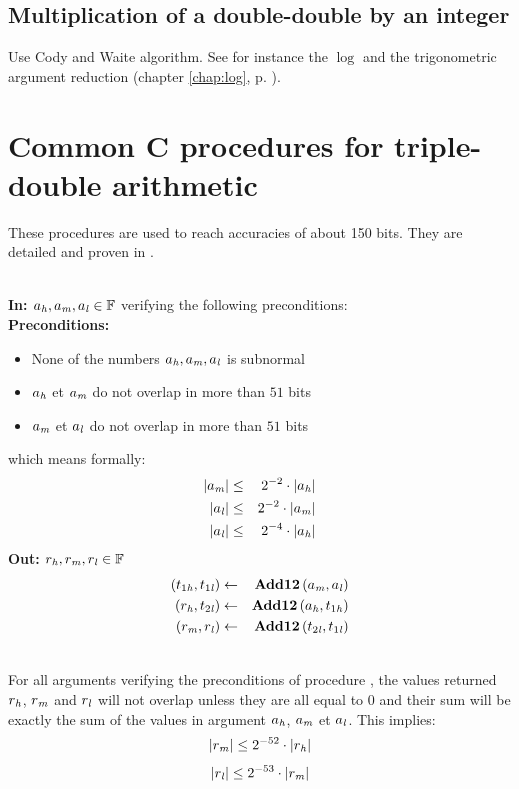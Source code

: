 \subsection{Multiplication of a double-double by an integer}


Use Cody and Waite algorithm. See for instance the $\log$ and the
trigonometric argument reduction (chapter \ref{chap:log}, p.
\pageref{chap:log}).


\section{Common C procedures for triple-double arithmetic\label{section:commonCtripledouble}}

These procedures are used to reach accuracies of about 150 bits. They
are detailed and proven in \cite{Lauter2005LIP:tripledouble}.
 

\begin{algorithm}[Renormalization] \label{renormalg}~\\
{\bf In: $a_{\mathit{h}}, a_{\mathit{m}}, a_{\mathit{l}} \in \mathbb {F}$} verifying the following preconditions:\\
{\bf Preconditions: }
\begin{itemize}
\item None of the numbers $a_{\mathit{h}}, a_{\mathit{m}}, a_{\mathit{l}}$ is subnormal
\item $a_{\mathit{h}}$ et $a_{\mathit{m}}$ do not overlap in more than $51$ bits
\item $a_{\mathit{m}}$ et $a_{\mathit{l}}$ do not overlap in more than $51$ bits
\end{itemize}
which means formally:
\begin{eqnarray*}
\left \vert a_{\mathit{m}} \right \vert & \leq & 2^{-2} \cdot \left \vert a_{\mathit{h}} \right \vert \\
\left \vert a_{\mathit{l}} \right \vert & \leq & 2^{-2} \cdot \left \vert a_{\mathit{m}} \right \vert \\
\left \vert a_{\mathit{l}} \right \vert & \leq & 2^{-4} \cdot \left \vert a_{\mathit{h}} \right \vert
\end{eqnarray*}
{\bf Out: $r_{\mathit{h}}, r_{\mathit{m}}, r_{\mathit{l}} \in \mathbb {F}$}
\begin{eqnarray*}
\left(t_{1\mathit{h}}, t_{1\mathit{l}}\right) & \gets & \mathbf{Add12}\left(a_{\mathit{m}},a_{\mathit{l}}\right) \\
\left(r_{\mathit{h}}, t_{2\mathit{l}}\right) & \gets & \mathbf{Add12}\left(a_{\mathit{h}}, t_{1\mathit{h}}\right) \\
\left(r_{\mathit{m}}, r_{\mathit{l}}\right) & \gets & \mathbf{Add12}\left(t_{2\mathit{l}}, t_{1\mathit{l}}\right)
\end{eqnarray*}
\end{algorithm}
\begin{theorem} ~\\
For all arguments verifying the preconditions of procedure \Renormalize, 
the values returned 
$r_{\mathit{h}}$, $r_{\mathit{m}}$ and $r_{\mathit{l}}$ will not overlap 
unless they are all equal to $0$ and their sum will be exactly the sum of the
values in argument $a_{\mathit{h}}$, $a_{\mathit{m}}$ et $a_{\mathit{l}}$.
This implies:
$$\left \vert r_{\mathit{m}} \right \vert \leq 2^{-52} \cdot \left \vert r_{\mathit{h}} \right \vert$$
$$\left \vert r_{\mathit{l}} \right \vert \leq 2^{-53} \cdot \left \vert r_{\mathit{m}} \right \vert$$
\end{theorem}



